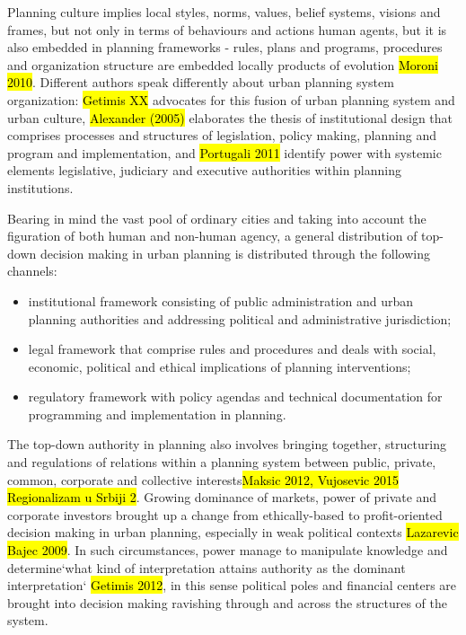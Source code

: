 \documentclass[11pt]{report}
\begin{document}
Planning culture implies local styles, norms, values, belief systems, visions and frames, but not only in terms of behaviours and actions human agents, but it is also embedded in planning frameworks - rules, plans and programs, procedures and organization structure are embedded locally products of evolution \hl{Moroni 2010}.
Different authors speak differently about urban planning system organization: \hl{Getimis XX} advocates for this fusion of urban planning system and urban culture, \hl{Alexander (2005)} elaborates the thesis of institutional design that comprises processes and structures of legislation, policy making, planning and program and implementation, and \hl{Portugali 2011} identify power with systemic elements legislative, judiciary and executive authorities within planning institutions.

Bearing in mind the vast pool of ordinary cities and taking into account the figuration of both human and non-human agency, a general distribution of top-down decision making in urban planning is distributed through the following channels:
\begin{itemize}
\item institutional framework consisting of public administration and urban planning authorities and addressing political and administrative jurisdiction;
\item legal framework that comprise rules and procedures and deals with social, economic, political and ethical implications of planning interventions;
\item regulatory framework with policy agendas and technical documentation for programming and implementation in planning.
\end{itemize}

The top-down authority in planning also involves bringing together, structuring and regulations of relations within a planning system between public, private, common, corporate and collective interests\footnotemark \hl{Maksic 2012, Vujosevic 2015 Regionalizam u Srbiji 2}.
Growing dominance of markets, power of private and corporate investors brought up a change from ethically-based to profit-oriented decision making in urban planning, especially in weak political contexts \hl{Lazarevic Bajec 2009}.
In such circumstances, power manage to manipulate knowledge and determine`what kind of interpretation attains authority as the dominant interpretation` \hl{Getimis 2012}, in this sense political poles and financial centers are brought into decision making ravishing through and across the structures of the system.
\end{document}
